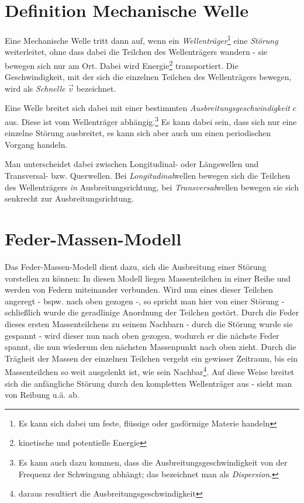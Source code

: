 
		\chapter{Definition Mechanische Welle}

Eine Mechanische Welle tritt dann auf, wenn ein \emph{Wellenträger}\footnote{Es kann sich dabei um feste, flüssige oder gasförmige Materie handeln} eine \emph{Störung} weiterleitet, ohne dass dabei die Teilchen des Wellenträgers wandern - sie bewegen sich nur am Ort. Dabei wird Energie\footnote{kinetische und potentielle Energie} transportiert. Die Geschwindigkeit, mit der sich die einzelnen Teilchen des Wellenträgers bewegen, wird als \emph{Schnelle} \(\vec{v}\) bezeichnet.

Eine Welle breitet sich dabei mit einer bestimmten \emph{Ausbreitungsgeschwindigkeit} \(c\) aus. Diese ist vom Wellenträger abhängig.\footnote{Es kann auch dazu kommen, dass die Ausbreitungsgeschwindigkeit von der Frequenz der Schwingung abhängt; das bezeichnet man als \emph{Dispersion}.} Es kann dabei sein, dass sich nur eine einzelne Störung ausbreitet, es kann sich aber auch um einen periodischen Vorgang handeln.

Man unterscheidet dabei zwischen Longitudinal- oder Längswellen und Transversal- bzw. Querwellen. Bei \emph{Longitudinal}wellen bewegen sich die Teilchen des Wellenträgers \emph{in} Ausbreitungsrichtung, bei \emph{Transversal}wellen bewegen sie sich senkrecht zur Ausbreitungsrichtung.



		\chapter{Feder-Massen-Modell}

Das Feder-Massen-Modell dient dazu, sich die Ausbreitung einer Störung vorstellen zu können: In diesen Modell liegen Massenteilchen in einer Reihe und werden von Federn miteinander verbunden. Wird nun eines dieser Teilchen angeregt - bspw. nach oben gezogen -, so spricht man hier von einer Störung - schließlich wurde die geradlinige Anordnung der Teilchen gestört. Durch die Feder dieses ersten Massenteilchens zu seinem Nachbarn - durch die Störung wurde sie gespannt - wird dieser nun nach oben gezogen, wodurch er die nächste Feder spannt, die nun wiederum den nächsten Massenpunkt nach oben zieht. Durch die Trägheit der Massen der einzelnen Teilchen vergeht ein gewisser Zeitraum, bis ein Massenteilchen so weit ausgelenkt ist, wie sein Nachbar\footnote{daraus resultiert die Ausbreitungsgeschwindigkeit}. Auf diese Weise breitet sich die anfängliche Störung durch den kompletten Wellenträger aus - sieht man von Reibung u.ä. ab.




